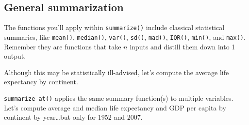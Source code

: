 \documentclass[
]{book}
\newenvironment{Shaded}{\begin{snugshade}}{\end{snugshade}}
\newcommand{\CommentTok}[1]{\textcolor[rgb]{0.56,0.35,0.01}{\textit{#1}}}
\newcommand{\DataTypeTok}[1]{\textcolor[rgb]{0.13,0.29,0.53}{#1}}
\newcommand{\KeywordTok}[1]{\textcolor[rgb]{0.13,0.29,0.53}{\textbf{#1}}}
\newcommand{\NormalTok}[1]{#1}
\newcommand{\OperatorTok}[1]{\textcolor[rgb]{0.81,0.36,0.00}{\textbf{#1}}}
\newcommand{\StringTok}[1]{\textcolor[rgb]{0.31,0.60,0.02}{#1}}
\begin{document}
\hypertarget{general-summarization}{%
\subsection{General summarization}\label{general-summarization}}

The functions you'll apply within \texttt{summarize()} include classical statistical summaries, like \texttt{mean()}, \texttt{median()}, \texttt{var()}, \texttt{sd()}, \texttt{mad()}, \texttt{IQR()}, \texttt{min()}, and \texttt{max()}. Remember they are functions that take \(n\) inputs and distill them down into 1 output.

Although this may be statistically ill-advised, let's compute the average life expectancy by continent.

\begin{Shaded}
\end{Shaded}

\texttt{summarize\_at()} applies the same summary function(s) to multiple variables. Let's compute average and median life expectancy and GDP per capita by continent by year\ldots but only for 1952 and 2007.
\end{document}

